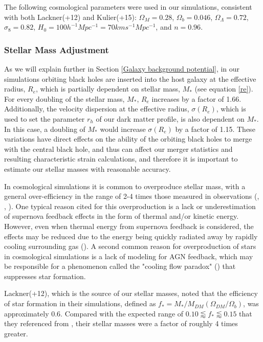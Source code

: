 \documentclass[english, apj]{emulateapj}
\begin{document}
The following cosmological parameters were used in our simulations, consistent with both Lackner(+12) and Kulier(+15):   $\Omega_M = 0.28$, $\Omega_b = 0.046$, $\Omega_\Lambda = 0.72$, $\sigma_8 = 0.82$, $H_0 = 100h^{-1}Mpc^{-1} = 70 km s^{-1} Mpc^{-1}$, and $n = 0.96$.

\subsubsection{Stellar Mass Adjustment}
As we will explain further in Section \ref{Galaxy background potential}, in our simulations orbiting black holes are inserted into the host galaxy at the effective radius, $R_e$, which is partially dependent on stellar mass, $M_*$ (see equation \ref{re}).  For every doubling of the stellar mass, $M_*$, $R_e$ increases by a factor of 1.66.  Additionally, the velocity dispersion at the effective radius, $\sigma(R_e)$, which is used to set the parameter $r_h$ of our dark matter profile, is also dependent on $M_*$.  In this case, a doubling of $M_*$ would increase $\sigma(R_e)$ by a factor of 1.15.  These variations have direct effects on the ability of the orbiting black holes to merge with the central black hole, and thus can affect our merger statistics and resulting characteristic strain calculations, and therefore it is important to estimate our stellar masses with reasonable accuracy.

In cosmological simulations it is common to overproduce stellar mass, with a general over-efficiency in the range of 2-4 times those measured in observations (\citet{1996ApJS..105...19K}, \citet{2010MNRAS.404.1111G}, \citet{2010ApJ...725.2312O}).  One typical reason cited for this overproduction is a lack or underestimation of supernova feedback effects in the form of thermal and/or kinetic energy.  However, even when thermal energy from supernova feedback is considered, the effects may be reduced due to the energy being quickly radiated away by rapidly cooling surrounding gas (\citet{1996ApJS..105...19K}).  A second common reason for overproduction of stars in cosmological simulations is a lack of modeling for AGN feedback, which may be responsible for a phenomenon called the "cooling flow paradox" (\citet{2001MNRAS.321L..20F}) that suppresses star formation. 

Lackner(+12), which is the source of our stellar masses, noted that the efficiency of star formation in their simulations, defined as $f_*=M_*/M_{DM}(\Omega_{DM}/\Omega_b)$, was approximately 0.6.  Compared with the expected range of $0.10 \lessapprox f_* \lessapprox 0.15$ that they referenced from \citet{2012ApJ...746...95L}, their stellar masses were a factor of roughly 4 times greater.
\end{document}
